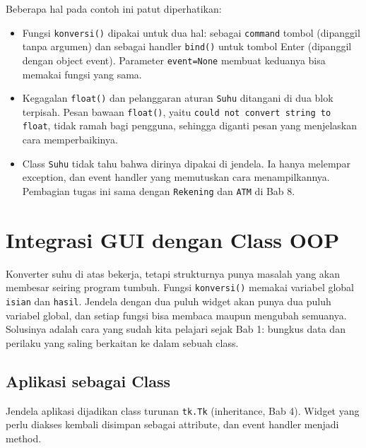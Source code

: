 Beberapa hal pada contoh ini patut diperhatikan:

\begin{itemize}
  \item Fungsi \texttt{konversi()} dipakai untuk dua hal: sebagai \texttt{command} tombol (dipanggil tanpa argumen) dan sebagai handler \texttt{bind()} untuk tombol Enter (dipanggil dengan object event). Parameter \texttt{event=None} membuat keduanya bisa memakai fungsi yang sama.
  \item Kegagalan \texttt{float()} dan pelanggaran aturan \texttt{Suhu} ditangani di dua blok terpisah. Pesan bawaan \texttt{float()}, yaitu \texttt{could not convert string to float}, tidak ramah bagi pengguna, sehingga diganti pesan yang menjelaskan cara memperbaikinya.
  \item Class \texttt{Suhu} tidak tahu bahwa dirinya dipakai di jendela. Ia hanya melempar exception, dan event handler yang memutuskan cara menampilkannya. Pembagian tugas ini sama dengan \texttt{Rekening} dan \texttt{ATM} di Bab 8.
\end{itemize}

\section{Integrasi GUI dengan Class OOP}

Konverter suhu di atas bekerja, tetapi strukturnya punya masalah yang akan membesar seiring program tumbuh. Fungsi \texttt{konversi()} memakai variabel global \texttt{isian} dan \texttt{hasil}. Jendela dengan dua puluh widget akan punya dua puluh variabel global, dan setiap fungsi bisa membaca maupun mengubah semuanya. Solusinya adalah cara yang sudah kita pelajari sejak Bab 1: bungkus data dan perilaku yang saling berkaitan ke dalam sebuah class.

\subsection{Aplikasi sebagai Class}

Jendela aplikasi dijadikan class turunan \texttt{tk.Tk} (inheritance, Bab 4). Widget yang perlu diakses kembali disimpan sebagai attribute, dan event handler menjadi method.

